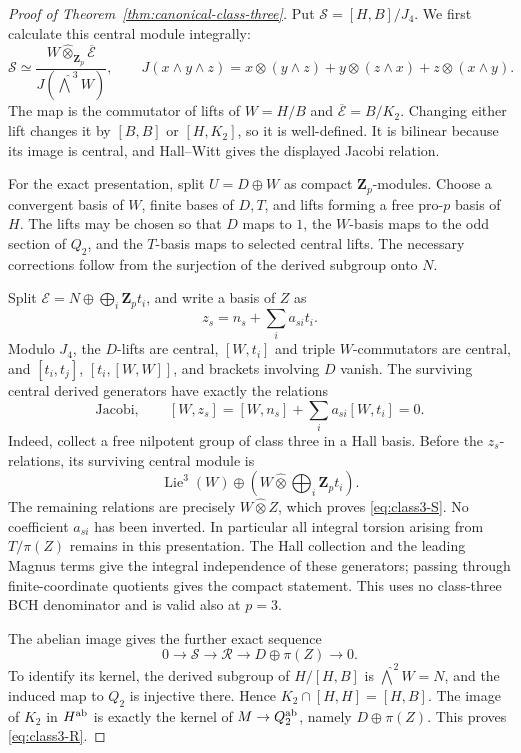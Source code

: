 \begin{proof}[Proof of Theorem~\ref{thm:canonical-class-three}]
Put \(\mathcal S=[H,B]/J_4\). We first calculate this central module
integrally:
\begin{equation}\label{eq:class3-S}
 \mathcal S\simeq
 \frac{W\widehat\otimes_{\mathbf Z_p}\overline{\mathcal E}}
 {J(\widehat{\bigwedge}^{\,3}W)},\qquad
 J(x\wedge y\wedge z)
 =x\otimes(y\wedge z)+y\otimes(z\wedge x)+z\otimes(x\wedge y).
\end{equation}
The map is the commutator of lifts of \(W=H/B\) and
\(\overline{\mathcal E}=B/K_2\). Changing either lift changes it by
\([B,B]\) or \([H,K_2]\), so it is well-defined.
It is bilinear because its image is central, and Hall--Witt
gives the displayed Jacobi relation.

For the exact presentation, split \(U=D\oplus W\) as compact
\(\mathbf Z_p\)-modules. Choose a convergent basis of \(W\),
finite bases of \(D,T\), and lifts forming a free pro-\(p\)
basis of \(H\). The lifts may be chosen so that \(D\) maps
to \(1\), the \(W\)-basis maps to the odd section of \(Q_2\),
and the \(T\)-basis maps to selected central lifts.
The necessary corrections follow from the surjection
of the derived subgroup onto \(N\).

Split \(\mathcal E=N\oplus\bigoplus_i\mathbf Z_pt_i\), and write a
basis of \(Z\) as
\[
 z_s=n_s+\sum_i a_{si}t_i.
\]
Modulo \(J_4\), the \(D\)-lifts are central,
\([W,t_i]\) and triple \(W\)-commutators are central,
and \([t_i,t_j]\), \([t_i,[W,W]]\), and brackets involving
\(D\) vanish. The surviving central derived generators
have exactly the relations
\[
 \text{Jacobi},\qquad
 [W,z_s]=[W,n_s]+\sum_i a_{si}[W,t_i]=0.
\]
Indeed, collect a free nilpotent group of class three in a
Hall basis. Before the \(z_s\)-relations, its surviving
central module is
\[
 \operatorname{Lie}^3(W)
 \oplus\left(W\widehat\otimes\bigoplus_i\mathbf Z_pt_i\right).
\]
The remaining relations are precisely \(W\widehat\otimes Z\),
which proves \eqref{eq:class3-S}. No coefficient \(a_{si}\)
has been inverted. In particular all integral torsion
arising from \(T/\pi(Z)\) remains in this presentation.
The Hall collection and the leading Magnus terms give
the integral independence of these generators; passing
through finite-coordinate quotients gives the compact
statement. This uses no class-three BCH denominator and
is valid also at \(p=3\).

The abelian image gives the further exact sequence
\begin{equation}\label{eq:class3-R}
 0\longrightarrow \mathcal S\longrightarrow \mathcal R
 \longrightarrow D\oplus\pi(Z)\longrightarrow0.
\end{equation}
To identify its kernel, the derived subgroup of
\(H/[H,B]\) is \(\widehat{\bigwedge}^2W=N\), and the induced
map to \(Q_2\) is injective there. Hence
\(K_2\cap[H,H]=[H,B]\).
The image of \(K_2\) in \(H^{\rm ab}\) is exactly the
kernel of \(M\to Q_2^{\rm ab}\), namely \(D\oplus\pi(Z)\).
This proves \eqref{eq:class3-R}.


\end{proof}
